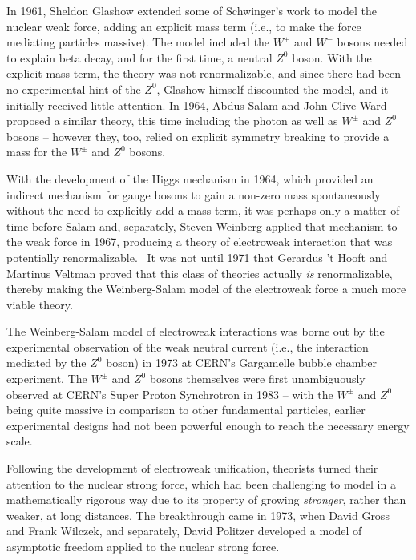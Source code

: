 In 1961, Sheldon Glashow extended some of Schwinger's work to model the nuclear weak force,  adding an explicit mass term (i.e., to make the force mediating particles massive).  The model included the $W^+$ and $W^-$ bosons needed to explain beta decay, and for the first time, a neutral $Z^0$ boson.  With the explicit mass term, the theory was not renormalizable, and since there had been no experimental hint of the $Z^0$, Glashow himself discounted the model, and it initially received little attention.  In 1964, Abdus Salam and John Clive Ward proposed a similar theory, this time including the photon as well as $W^\pm$ and $Z^0$ bosons -- however they, too, relied on explicit symmetry breaking to provide a mass for the $W^\pm$ and $Z^0$ bosons\cite{Glashow1959}\cite{Glashow1961}\cite{SalamWard1964}.


With the development of the Higgs mechanism in 1964, which provided an indirect mechanism for gauge bosons to gain a non-zero mass spontaneously without the need to explicitly add a mass term\cite{Higgs1964EnglertBrout}\cite{Higgs1964Higgs}\cite{Higgs1964GuralnikHagenKibble}\cite{BroutEnglertArXiv}\cite{guralnik2009}, it was perhaps only a matter of time before Salam and, separately, Steven Weinberg applied that mechanism to the weak force in 1967, producing a theory of electroweak interaction that was potentially renormalizable\cite{Weinberg1967}\cite{salam1968}.~  It was not until 1971 that Gerardus 't Hooft and Martinus Veltman proved that this class of theories actually \emph{is} renormalizable, thereby making the Weinberg-Salam model of the electroweak force a much more viable theory\cite{thooftveltman1972}.

The Weinberg-Salam model of electroweak interactions was borne out by the experimental observation of the weak neutral current (i.e., the interaction mediated by the $Z^0$ boson) in 1973 at CERN's Gargamelle bubble chamber experiment\cite{gargamelle}.  The $W^\pm$ and $Z^0$ bosons themselves were first unambiguously observed at CERN's Super Proton Synchrotron in 1983\cite{UA1W}\cite{UA2W}\cite{UA1Z}\cite{UA2Z} -- with the $W^\pm$ and $Z^0$ being quite massive in comparison to other fundamental particles, earlier experimental designs had not been powerful enough to reach the necessary energy scale.   

Following the development of electroweak unification, 
theorists turned their attention to the nuclear strong force, which had been challenging to model in a mathematically rigorous way due to its property of growing \emph{stronger}, rather than weaker, at long distances.  The breakthrough came in 1973, when David Gross and Frank Wilczek, and separately, David Politzer developed a model of asymptotic freedom applied to the nuclear strong force\cite{gross1973asymptotically}\cite{gross1973ultraviolet}\cite{politzer1973reliable}.  

